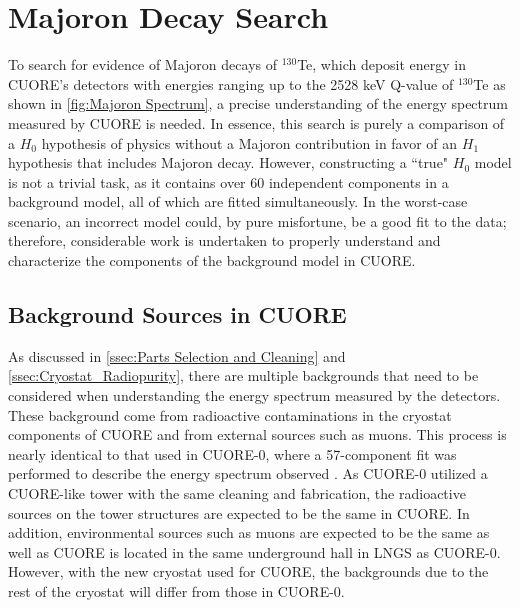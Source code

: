 \chapter{Majoron Decay Search}
To search for evidence of Majoron decays of $^{130}$Te, which deposit energy in CUORE's detectors with energies ranging up to the 2528 keV Q-value of $^{130}$Te as shown in \autoref{fig:Majoron Spectrum}, a precise understanding of the energy spectrum measured by CUORE is needed.
In essence, this search is purely a comparison of a $H_0$ hypothesis of physics without a Majoron contribution in favor of an $H_1$ hypothesis that includes Majoron decay.
However, constructing a ``true" $H_0$ model is not a trivial task, as it contains over 60 independent components in a background model, all of which are fitted simultaneously.
In the worst-case scenario, an incorrect model could, by pure misfortune, be a good fit to the data; therefore, considerable work is undertaken to properly understand and characterize the components of the background model in CUORE.

\section{Background Sources in CUORE}
As discussed in \autoref{ssec:Parts Selection and Cleaning} and \autoref{ssec:Cryostat_Radiopurity}, there are multiple backgrounds that need to be considered when understanding the energy spectrum measured by the detectors.
These background come from radioactive contaminations in the cryostat components of CUORE and from external sources such as muons.
This process is nearly identical to that used in CUORE-0, where a 57-component fit was performed to describe the energy spectrum observed \cite{Alduino:2016vtd}.
As CUORE-0 utilized a CUORE-like tower with the same cleaning and fabrication, the radioactive sources on the tower structures are expected to be the same in CUORE.
In addition, environmental sources such as muons are expected to be the same as well as CUORE is located in the same underground hall in LNGS as CUORE-0.
However, with the new cryostat used for CUORE, the backgrounds due to the rest of the cryostat will differ from those in CUORE-0.

